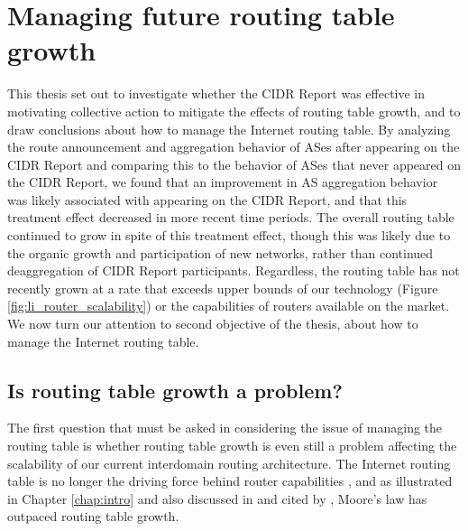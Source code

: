 \chapter{Managing future routing table growth}
\label{chap:conclusion}

This thesis set out to investigate whether the CIDR Report was effective in
motivating collective action to mitigate the effects of routing table growth,
and to draw conclusions about how to manage the Internet routing table. By
analyzing the route announcement and aggregation behavior of ASes after
appearing on the CIDR Report and comparing this to the behavior of ASes that
never appeared on the CIDR Report, we found that an improvement in AS
aggregation behavior was likely associated with appearing on the CIDR Report,
and that this treatment effect decreased in more recent time periods. The
overall routing table continued to grow in spite of this treatment effect,
though this was likely due to the organic growth and participation of new
networks, rather than continued deaggregation of CIDR Report participants.
Regardless, the routing table has not recently grown at a rate that exceeds
upper bounds of our technology (Figure \ref{fig:li_router_scalability}) or the
capabilities of routers available on the market. We now turn our attention to
second objective of the thesis, about how to manage the Internet routing table.


\section{Is routing table growth a problem?}
The first question that must be asked in considering the issue of managing the
routing table is whether routing table growth is even still a problem affecting
the scalability of our current interdomain routing architecture. The Internet
routing table is no longer the driving force behind router capabilities
\cite{Davie:2011uq}, and as illustrated in Chapter \ref{chap:intro} and also
discussed in \cite{Fall:2009fk} and cited by \cite{Huston:2011ys}, Moore's law
has outpaced routing table growth.

